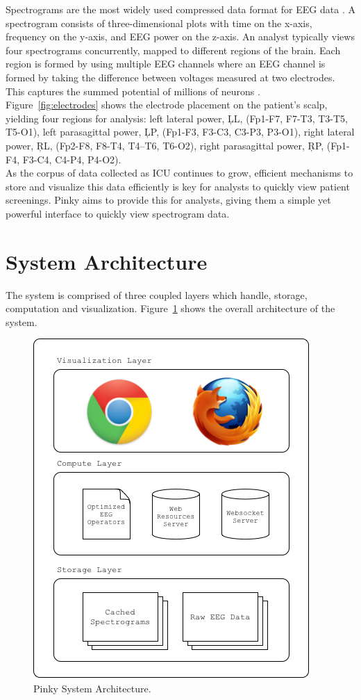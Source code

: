 Spectrograms are the most widely used compressed data format for EEG data
\cite{ceeg-1}. A spectrogram consists of three-dimensional plots with time on
the x-axis, frequency on the y-axis, and EEG power on the z-axis. An analyst
typically views four spectrograms concurrently, mapped to different regions of
the brain. Each region is formed by using multiple EEG channels where an EEG
channel is formed by taking the difference between voltages measured at two
electrodes. This captures the summed potential of millions of neurons
\cite{eeg-ml}. Figure~\ref{fig:electrodes} shows the electrode placement on
the patient's scalp, yielding four regions for analysis: left lateral power,
\c{LL}, (Fp1-F7, F7-T3, T3-T5, T5-O1), left parasagittal power, \c{LP},
(Fp1-F3, F3-C3, C3-P3, P3-O1), right lateral power, \c{RL}, (Fp2-F8, F8-T4,
T4–T6, T6-O2), right parasagittal power, \c{RP}, (Fp1-F4, F3-C4, C4-P4, P4-O2).
\\

As the corpus of data collected as ICU continues to grow, efficient mechanisms
to store and visualize this data efficiently is key for analysts to quickly
view patient screenings. Pinky aims to provide this for analysts, giving them a
simple yet powerful interface to quickly view spectrogram data.

\section{System Architecture}

The system is comprised of three coupled layers which handle, storage,
computation and visualization. Figure~\ref{fig:system-architecture} shows the
overall architecture of the system.

\begin{figure}[h]
\begin{center}
\includegraphics[scale=0.75]{./img/system-architecture.png}
\caption{Pinky System Architecture.}
\label{fig:system-architecture}
\end{center}
\end{figure}

